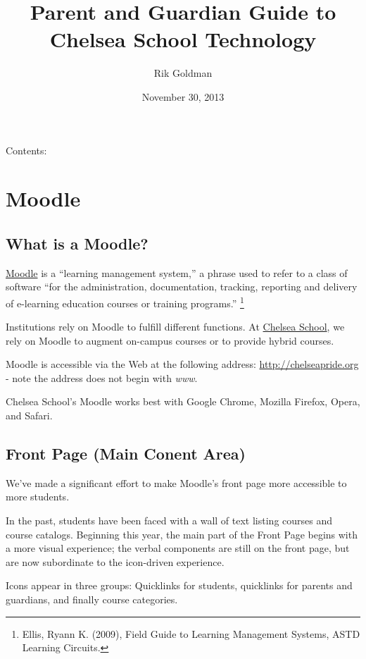 \documentclass[letterpaper,10pt,english]{sphinxmanual}
\title{Parent and Guardian Guide to Chelsea School Technology}
\date{November 30, 2013}
\author{Rik Goldman}
\begin{document}
\maketitle
\tableofcontents
{}\label{Index::doc}


Contents:


\chapter{Moodle}
\label{moodle:chelsea-school-technology-for-parents}\label{moodle::doc}\label{moodle:moodle}

\section{What is a Moodle?}
\label{moodle:what-is-a-moodle}
\href{https://moodle.org/about/}{Moodle} is a ``learning management system,'' a phrase used to refer to a class of software  ``for the administration, documentation, tracking, reporting and delivery of e-learning education courses or training programs.'' \footnote{
Ellis, Ryann K. (2009), Field Guide to Learning Management Systems, ASTD Learning Circuits.
}

Institutions rely on Moodle to fulfill different functions. At \href{http://chelseaschool.edu}{Chelsea School}, we rely on Moodle to augment on-campus courses or to provide hybrid courses.

Moodle is accessible via the Web at the following address: \href{http://chelseapride.org}{http://chelseapride.org} - note the address does not begin with \emph{www}.

Chelsea School's Moodle works best with Google Chrome, Mozilla Firefox, Opera, and Safari.


\section{Front Page (Main Conent Area)}
\label{moodle:front-page-main-conent-area}
We've made a significant effort to make Moodle's front page more accessible to more students.

In the past, students have been faced with a wall of text listing courses and course catalogs. Beginning this year, the main part of the Front Page begins with a more visual experience; the verbal components are still on the front page, but are now subordinate to the icon-driven experience.

Icons appear in three groups: Quicklinks for students, quicklinks for parents and guardians, and finally course categories.
\end{document}
